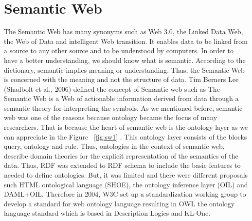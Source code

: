 \section{Semantic Web}
The Semantic Web has many synonyms such as Web 3.0, the Linked Data Web, the Web of Data and intelligent Web transition. It enables data to be linked from a source to any other source and to be understood by computers. In order to have a better  understanding, we should know what is semantic. According to the dictionary, semantic implies meaning or understanding. Thus, the Semantic Web is concerned with the meaning and not the structure of data. Tim Berners Lee (Shadbolt et al., 2006) defined the concept of Semantic web such as The Semantic Web is a Web of actionable information derived from data through a semantic theory for interpreting the symbols. 
As we mentioned before, semantic web was one of the reasons because ontology became the focus of many researchers. That is because the heart of semantic web is the ontology layer as we can appreciate in the Figure ~\ref{fig:sw1} .
This ontology layer consists of the blocks query, ontology and rule. Thus, ontologies in the context of semantic web, describe domain theories for the explicit representation of the semantics of the data. Thus, RDF was extended to RDF schema to include the basic features to needed to define ontologies. But, it was limited and there were different proposals such HTML ontological language (SHOE), the ontology inference layer (OIL) and DAML+OIL. Therefore in 2004, W3C set up a standardization working group to develop a standard for web ontology language resulting in OWL the ontology language standard which is based in Description Logics and KL-One.